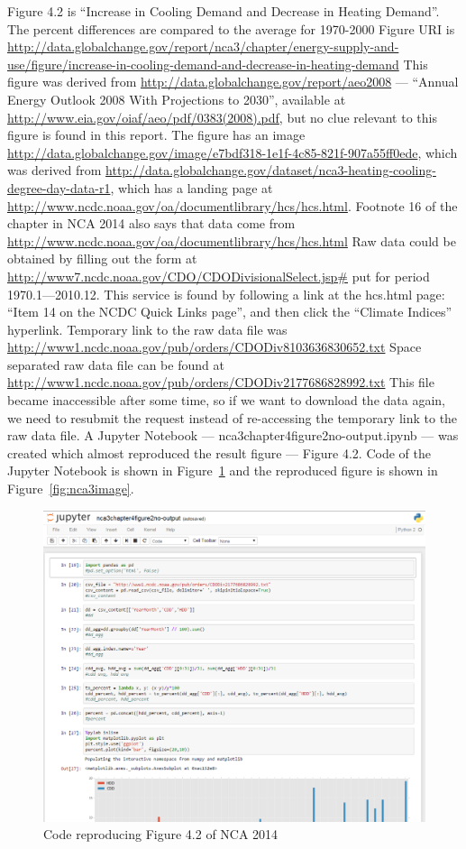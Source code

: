 Figure 4.2 is ``Increase in Cooling Demand and Decrease in Heating Demand''. The
percent differences are compared to the average for 1970-2000
Figure URI is \url{http://data.globalchange.gov/report/nca3/chapter/energy-supply-and-use/figure/increase-in-cooling-demand-and-decrease-in-heating-demand}
This figure was derived from \url{http://data.globalchange.gov/report/aeo2008} --- ``Annual Energy Outlook 2008 With Projections to 2030'', available at \url{http://www.eia.gov/oiaf/aeo/pdf/0383(2008).pdf}, but no clue relevant to this figure is found in this report.
The figure has an image \url{http://data.globalchange.gov/image/e7bdf318-1e1f-4c85-821f-907a55ff0ede}, which was derived from \url{http://data.globalchange.gov/dataset/nca3-heating-cooling-degree-day-data-r1}, which has a landing page at \url{http://www.ncdc.noaa.gov/oa/documentlibrary/hcs/hcs.html}. Footnote 16 of the chapter in NCA 2014 also says that data come from \url{http://www.ncdc.noaa.gov/oa/documentlibrary/hcs/hcs.html}
Raw data could be obtained by filling out the form at \url{http://www7.ncdc.noaa.gov/CDO/CDODivisionalSelect.jsp#} put for period 1970.1---2010.12.
This service is found by following a link at the hcs.html page: ``Item 14 on the NCDC Quick Links page'', and then click the ``Climate Indices'' hyperlink.
Temporary link to the raw data file was \url{http://www1.ncdc.noaa.gov/pub/orders/CDODiv8103636830652.txt}
Space separated raw data file can be found at  \url{http://www1.ncdc.noaa.gov/pub/orders/CDODiv2177686828992.txt}
This file became inaccessible after some time, so if we want to download the data again, we need to resubmit the request instead of re-accessing the temporary link to the raw data file.
A Jupyter Notebook --- nca3chapter4figure2no-output.ipynb --- was created which almost reproduced the result figure --- Figure 4.2.
Code of the Jupyter Notebook is shown in Figure~\ref{fig:nca3code} and the reproduced figure is shown in Figure~\ref{fig:nca3image}.
\begin{figure}
	\includegraphics[width=\textwidth]{nca3code.png}
	\caption{Code reproducing Figure 4.2 of NCA 2014}
	\label{fig:nca3code}
\end{figure}
